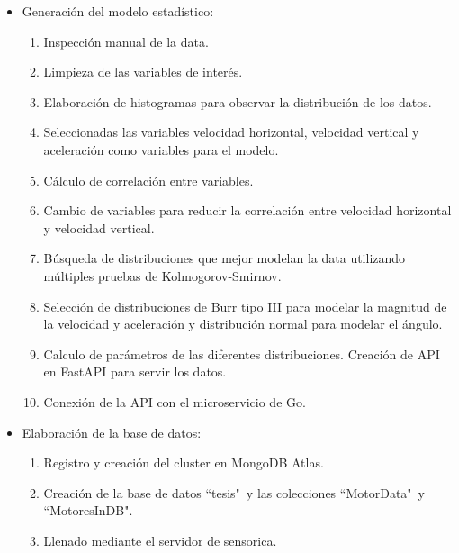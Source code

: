 \begin{itemize}
        \item Generación del modelo estadístico:
    \begin{enumerate}
        \item Inspección manual de la data.
        \item Limpieza de las variables de interés.
        \item Elaboración de histogramas para observar la distribución de los datos.
        \item Seleccionadas las variables velocidad horizontal, velocidad
            vertical y aceleración como variables para el modelo.
        \item Cálculo de correlación entre variables.
        \item Cambio de variables para reducir la correlación entre velocidad
            horizontal y velocidad vertical.
        \item Búsqueda de distribuciones que mejor modelan la data utilizando
            múltiples pruebas de Kolmogorov-Smirnov.
        \item Selección de distribuciones de Burr tipo III para modelar la
            magnitud de la velocidad y aceleración y distribución normal para
            modelar el ángulo.
        \item Calculo de parámetros de las diferentes distribuciones. Creación
            de API en FastAPI para servir los datos.
        \item Conexión de la API con el microservicio de Go.
    \end{enumerate}

    \item Elaboración de la base de datos:
        \begin{enumerate}
            \item Registro y creación del cluster en MongoDB Atlas.
            \item Creación de la base de datos ``tesis"\  y las colecciones
                ``MotorData"\  y ``MotoresInDB".
            \item Llenado mediante el servidor de sensorica.
        \end{enumerate}


\end{itemize}

